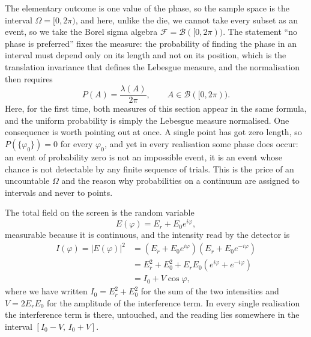 		The elementary outcome is one value of the phase, so the sample space is the interval
		$\Omega = [0,2\pi)$, and here, unlike the die, we cannot take every subset as an event,
		so we take the Borel sigma algebra $\mathcal{F} = \mathcal{B}([0,2\pi))$. The statement
		``no phase is preferred'' fixes the measure: the probability of finding the phase in an
		interval must depend only on its length and not on its position, which is the
		translation invariance that defines the Lebesgue measure, and the normalisation then
		requires
		\begin{equation}\label{eq:RandomPhaseMeasure}
			P(A) = \frac{\lambda(A)}{2\pi}, \qquad A\in\mathcal{B}([0,2\pi)).
		\end{equation}
		Here, for the first time, both measures of this section appear in the same formula, and
		the uniform probability is simply the Lebesgue measure normalised. One consequence is
		worth pointing out at once. A single point has got zero length, so
		$P(\{\varphi_{0}\}) = 0$ for every $\varphi_{0}$, and yet in every realisation some phase
		does occur: an event of probability zero is not an impossible event, it is an event
		whose chance is not detectable by any finite sequence of trials. This is the price of
		an uncountable $\Omega$ and the reason why probabilities on a continuum are assigned to
		intervals and never to points.

		The total field on the screen is the random variable
		\begin{equation}\label{eq:RandomPhaseField}
			E(\varphi) = E_{r} + E_{0}e^{i\varphi},
		\end{equation}
		measurable because it is continuous, and the intensity read by the detector is
		\begin{equation}\label{eq:RandomPhaseIntensity}
			\begin{split}
				I(\varphi) = \left|E(\varphi)\right|^{2}
				&= \left(E_{r} + E_{0}e^{i\varphi}\right)\left(E_{r} + E_{0}e^{-i\varphi}\right)\\
				&= E_{r}^{2} + E_{0}^{2} + E_{r}E_{0}\left(e^{i\varphi} + e^{-i\varphi}\right)\\
				&= I_{0} + V\cos\varphi,
			\end{split}
		\end{equation}
		where we have written $I_{0} = E_{r}^{2}+E_{0}^{2}$ for the sum of the two intensities
		and $V = 2E_{r}E_{0}$ for the amplitude of the interference term. In every single
		realisation the interference term is there, untouched, and the reading lies somewhere
		in the interval $[I_{0}-V,\,I_{0}+V]$.

